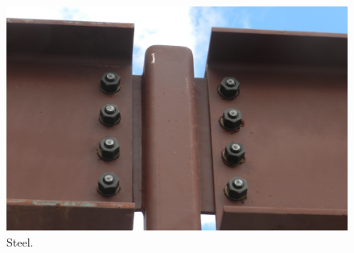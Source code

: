 \begin{figure}[!htb]
\centering
\includegraphics[width=.50\columnwidth]{images/050steel}
\caption[Steel]{Steel.}
\label{fig:050steel}
\end{figure}